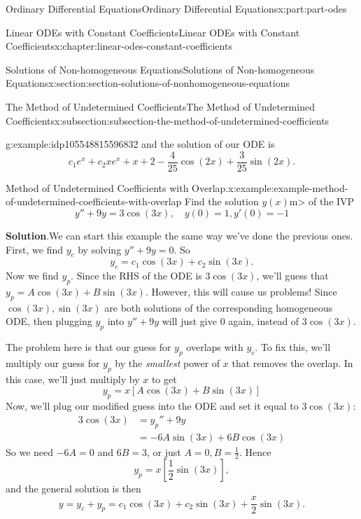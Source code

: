 \documentclass[twoside,10pt,]{book}
\newcommand{\blocktitlefont}{\relax}
\numberwithin{equation}{part}
\newcommand{\amp}{&}
\begin{document}
\begin{partptx}{Ordinary Differential Equations}{}{Ordinary Differential Equations}{}{}{x:part:part-odes}
\begin{chapterptx}{Linear ODEs with Constant Coefficients}{}{Linear ODEs with Constant Coefficients}{}{}{x:chapter:linear-odes-constant-coefficients}
\begin{sectionptx}{Solutions of Non-homogeneous Equations}{}{Solutions of Non-homogeneous Equations}{}{}{x:section:section-solutions-of-nonhomogeneous-equations}
\begin{subsectionptx}{The Method of Undetermined Coefficients}{}{The Method of Undetermined Coefficients}{}{}{x:subsection:subsection-the-method-of-undetermined-coefficients}
\begin{example}{}{g:example:idp105548815596832}
and the solution of our ODE is%
\begin{equation*}
c_{1}e^{x} + c_{2}xe^{x} + x + 2 - \frac{4}{25}\cos(2x) + \frac{3}{25}\sin(2x).
\end{equation*}
%
\end{example}
\begin{example}{Method of Undetermined Coefficients with Overlap.}{x:example:example-method-of-undetermined-coefficients-with-overlap}%
Find the solution \(y(x)\)m\textgreater{} of the IVP%
\begin{equation*}
y''+9y = 3\cos(3x),\quad y(0) = 1,y'(0) = -1
\end{equation*}
%
\par\smallskip%
\noindent\textbf{\blocktitlefont Solution}.\hypertarget{g:solution:idp105548815645728}{}\quad{}We can start this example the same way we've done the previous ones. First, we find \(y_{c}\) by solving \(y''+9y=0\). So%
\begin{equation*}
y_{c} = c_{1}\cos(3x)+c_{2}\sin(3x).
\end{equation*}
Now we find \(y_{p}\). Since the RHS of the ODE is \(3\cos(3x)\), we'll guess that \(y_{p} = A\cos(3x)+B\sin(3x)\). However, this will cause us problems! Since \(\cos(3x),\sin(3x)\) are both solutions of the corresponding homogeneous ODE, then plugging \(y_{p}\) into \(y''+9y\) will just give \(0\) again, instead of \(3\cos(3x)\).%
\par
The problem here is that our guess for \(y_{p}\) overlaps with \(y_{c}\). To fix this, we'll multiply our guess for \(y_{p}\) by the \emph{smallest} power of \(x\) that removes the overlap. In this case, we'll just multiply by \(x\) to get%
\begin{equation*}
y_{p} = x[A\cos(3x)+B\sin(3x)]
\end{equation*}
Now, we'll plug our modified guess into the ODE and set it equal to \(3\cos(3x)\):%
\begin{align*}
3\cos(3x)\amp = y_{p}'' + 9y\\
\amp = -6A\sin(3x)+6B\cos(3x)
\end{align*}
So we need \(-6A = 0\) and \(6B = 3\), or just \(A = 0,B = \frac{1}{2}\). Hence%
\begin{equation*}
y_{p} = x\left[\frac{1}{2}\sin(3x)\right],
\end{equation*}
and the general solution is then%
\begin{equation*}
y = y_{c}+y_{p} = c_{1}\cos(3x)+c_{2}\sin(3x) + \frac{x}{2}\sin(3x).
\end{equation*}

\end{example}
\end{subsectionptx}
\end{sectionptx}
\end{chapterptx}
\end{partptx}
\end{document}
